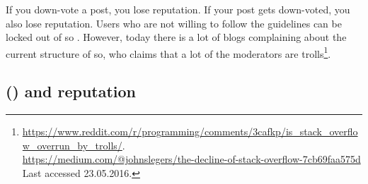 If you down-vote a post, you lose reputation. 
If your post gets down-voted, you also lose reputation. 
Users who are not willing to follow the guidelines can be locked out of \gls{so} \cite{Atwood2009}.
However, today there is a lot of blogs complaining about the current structure of \gls{so}, who claims that a lot of the moderators are
trolls\footnote{\url{https://www.reddit.com/r/programming/comments/3cafkp/is_stack_overflow_overrun_by_trolls/}. \\	
	\url{https://medium.com/@johnslegers/the-decline-of-stack-overflow-7cb69faa575d} \\ 
	Last accessed 23.05.2016. 
}.

\subsection[Stack Overflow and reputation]{ () and reputation}
\label{sec:research_on_so}

